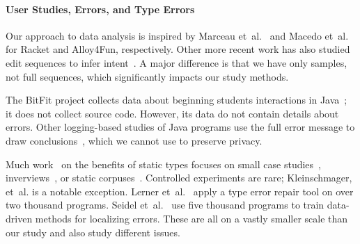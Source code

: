 \documentclass[english,submission,cleveref]{programming}
\begin{document}



\paragraph{User Studies, Errors, and Type Errors}

Our approach to data analysis is inspired by Marceau
et~al.~\cite{mfk-onward-2011,mfk-sigcse-2011} and
Macedo et~al.~\cite{mcpcsprs-abz-2020,mcpcsprs-scp-2021}
for Racket and Alloy4Fun, respectively. Other more recent work has
also studied edit sequences to infer intent~\cite{wk-koli-2020,lgk-pj-2022,rsgl-cpp-2020}.
A major difference is that we have only samples, not full sequences,
which significantly impacts our study methods.

The BitFit project collects data about beginning students interactions in
Java~\cite{ekc-wccce-2016,anna-russo-kennedy-ms-2006}; it does
not collect source code.
However, its data do not contain details about errors.
Other logging-based studies of Java programs use the full error message to
draw conclusions~\cite{bgimgm-cse-2016,dlc-iticse-2014}, which we
cannot use to preserve privacy.

Much work~\cite{empirical-types,heeren-thesis} on the benefits of static types focuses on
small case studies~\cite{w-popl-1986,hw-scp-2004,td-tosem-2001},
inverviews~\cite{cdhhjklwya-hatra-2020,gstf-hatra-2021,cams-oopsla-2020},
or static
corpuses~\cite{rppd-fse-2014,bhmvv-toplas-2019,bmvv-arxiv-2019}.
Controlled experiments are rare;
Kleinschmager, et~al.\cite{khrts-icpc-2012} is a notable exception.
Lerner et~al.~\cite{lfgc-pldi-2007} apply a type error repair tool on
over two thousand programs.
Seidel et~al.~\cite{sscwj-oopsla-2017,sjw-jfp-2018} use five thousand programs
to train data-driven methods for localizing errors.
These are all on a vastly smaller scale than our study and also study
different issues.

%
%
%
%
%
\end{document}
